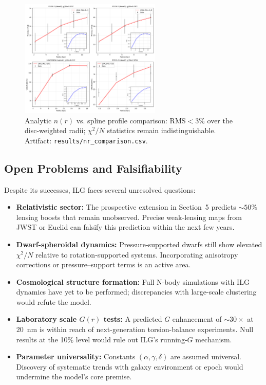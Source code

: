 \documentclass[12pt,a4paper]{article}
\begin{document}
\begin{figure}[h]
\centering
\includegraphics[width=0.6\textwidth]{results/nr_comparison.png}
\caption{Analytic $n(r)$ vs. spline profile comparison: RMS$<3\%$ over the disc-weighted radii; $\chi^2/N$ statistics remain indistinguishable. Artifact: \texttt{results/nr\_comparison.csv}.}
\label{fig:nr-comparison}
\end{figure}

\subsection{Open Problems and Falsifiability}

Despite its successes, ILG faces several unresolved questions:

\begin{itemize}
  \item \textbf{Relativistic sector:} The prospective extension in Section~5 predicts $\sim 50\%$ lensing boosts that remain unobserved.  Precise weak-lensing maps from JWST or Euclid can falsify this prediction within the next few years.
  \item \textbf{Dwarf-spheroidal dynamics:} Pressure-supported dwarfs still show elevated $\chi^2/N$ relative to rotation-supported systems.  Incorporating anisotropy corrections or pressure–support terms is an active area.
  \item \textbf{Cosmological structure formation:} Full N-body simulations with ILG dynamics have yet to be performed; discrepancies with large-scale clustering would refute the model.
  \item \textbf{Laboratory scale $G(r)$ tests:} A predicted $G$ enhancement of $\sim 30\times$ at $20$~nm is within reach of next-generation torsion-balance experiments.  Null results at the 10\% level would rule out ILG's running-$G$ mechanism.
  \item \textbf{Parameter universality:} Constants $(\alpha, \gamma, \delta)$ are assumed universal.  Discovery of systematic trends with galaxy environment or epoch would undermine the model's core premise.
\end{itemize}
\end{document}
